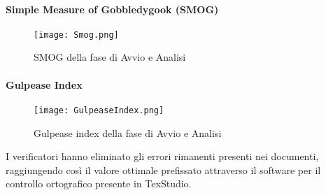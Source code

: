 \paragraph{Simple Measure of Gobbledygook (SMOG)}
\hspace{15cm}
\begin{figure}[!htbp]
	\centering
	\texttt{[image: Smog.png]}
	\caption{SMOG della fase di Avvio e Analisi}
\end{figure}
\clearpage
\paragraph{Gulpease Index}
\hspace{15cm}
\begin{figure}[!htbp]
	\centering
	\texttt{[image: GulpeaseIndex.png]}
	\caption{Gulpease index della fase di Avvio e Analisi}
\end{figure}

 I verificatori hanno eliminato gli errori rimanenti presenti nei documenti, raggiungendo così il valore ottimale prefissato attraverso il software per il controllo ortografico presente in TexStudio. 